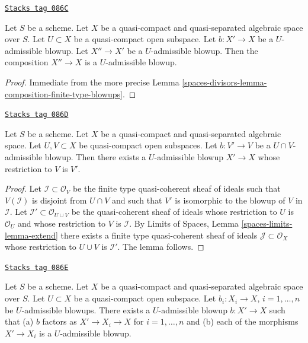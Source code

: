 \begin{lemma}
\label{spaces-divisors-lemma-composition-admissible-blowups}
\href{https://stacks.math.columbia.edu/tag/086C}{\texttt{Stacks tag 086C}}

Let $S$ be a scheme.
Let $X$ be a quasi-compact and quasi-separated algebraic space over $S$.
Let $U \subset X$ be a quasi-compact open subspace.
Let $b : X' \to X$ be a $U$-admissible blowup.
Let $X'' \to X'$ be a $U$-admissible blowup.
Then the composition $X'' \to X$ is a $U$-admissible blowup.
\end{lemma}

\begin{proof}
Immediate from the more precise
Lemma \ref{spaces-divisors-lemma-composition-finite-type-blowups}.
\end{proof}

\begin{lemma}
\label{spaces-divisors-lemma-extend-admissible-blowups}
\href{https://stacks.math.columbia.edu/tag/086D}{\texttt{Stacks tag 086D}}

Let $S$ be a scheme.
Let $X$ be a quasi-compact and quasi-separated algebraic space.
Let $U, V \subset X$ be quasi-compact open subspaces.
Let $b : V' \to V$ be a $U \cap V$-admissible blowup.
Then there exists a $U$-admissible blowup $X' \to X$
whose restriction to $V$ is $V'$.
\end{lemma}

\begin{proof}
Let $\mathcal{I} \subset \mathcal{O}_V$ be the finite type
quasi-coherent sheaf of ideals such that $V(\mathcal{I})$ is
disjoint from $U \cap V$ and such that $V'$ is isomorphic to the
blowup of $V$ in $\mathcal{I}$. Let
$\mathcal{I}' \subset \mathcal{O}_{U \cup V}$ be the quasi-coherent
sheaf of ideals whose restriction to $U$ is $\mathcal{O}_U$ and
whose restriction to $V$ is $\mathcal{I}$.
By Limits of Spaces, Lemma \ref{spaces-limits-lemma-extend}
there exists a finite type quasi-coherent sheaf of ideals
$\mathcal{J} \subset \mathcal{O}_X$ whose restriction to $U \cup V$ is
$\mathcal{I}'$. The lemma follows.
\end{proof}

\begin{lemma}
\label{spaces-divisors-lemma-dominate-admissible-blowups}
\href{https://stacks.math.columbia.edu/tag/086E}{\texttt{Stacks tag 086E}}

Let $S$ be a scheme.
Let $X$ be a quasi-compact and quasi-separated algebraic space over $S$.
Let $U \subset X$ be a quasi-compact open subspace.
Let $b_i : X_i \to X$, $i = 1, \ldots, n$ be $U$-admissible blowups.
There exists a $U$-admissible blowup $b : X' \to X$ such that
(a) $b$ factors as $X' \to X_i \to X$ for $i = 1, \ldots, n$ and
(b) each of the morphisms $X' \to X_i$ is a $U$-admissible blowup.
\end{lemma}


